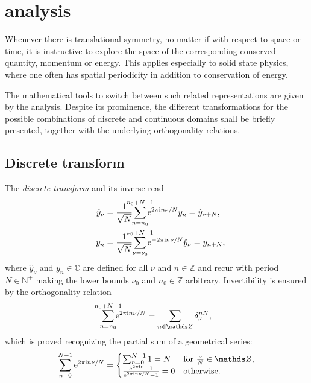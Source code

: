
\chapter{ analysis}
\label{Fourier analysis}

Whenever there is translational symmetry, no matter if with respect to space or
time, it is instructive to explore the space of the corresponding conserved
quantity, momentum or energy. This applies especially to solid state physics,
where one often has spatial periodicity in addition to conservation of energy.

The mathematical tools to switch between such related representations are given
by the  analysis. Despite its prominence, the different
transformations for the possible combinations of discrete and continuous domains
shall be briefly presented, together with the underlying orthogonality
relations.

\section{Discrete  transform}

The \emph{discrete  transform} and its inverse read
%
\begin{align*}
    \hat y_\nu &= \frac 1 {\sqrt N}
    \smashoperator{\sum_{n = n_0}^{n_0 + N - 1}}
    \E^{2 \pi \I n \nu / N} y_n = \hat y_{\nu + N},
    \\
    \quad y_n &= \frac 1 {\sqrt N}
    \smashoperator{\sum_{\nu = \nu_0}^{\nu_0 + N - 1}}
    \E^{-2 \pi \I n \nu / N} \hat y_\nu = y_{n + N},
\end{align*}
%
where $\hat y_\nu$ and $y_n \in \mathds C$ are defined for all $\nu$ and $n \in
\mathds Z$ and recur with period $N \in \mathds N^+$ making the lower bounds
$\nu_0$ and $n_0 \in \mathds Z$ arbitrary. Invertibility is ensured by the
orthogonality relation
%
\begin{equation} \label{DFT orthogonality relation}
    \smashoperator{\sum_{n = n_0}^{n_0 + N - 1}} \E^{2 \pi \I n \nu / N} =
    \sum_{n \in \mathds Z} \delta_\nu^{n N},
\end{equation}
%
which is proved recognizing the partial sum of a geometrical series:
%
\begin{equation*}
    \sum_{n = 0}^{N - 1} \E^{2 \pi \I n \nu / N} =
    \begin{cases}
        \sum_{n = 0}^{N - 1} 1 = N
            & \text{for $\frac \nu N \in \mathds Z$,} \\
        \frac{\E^{2 \pi \I \nu} - 1}{\E^{2 \pi \I n \nu / N} - 1} = 0
            & \text{otherwise.}
    \end{cases}
\end{equation*}


